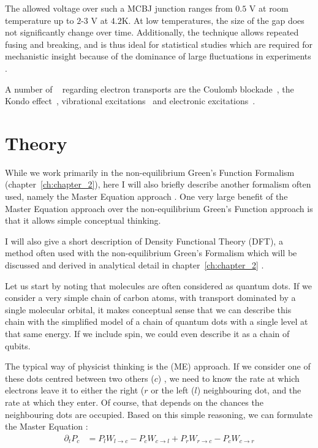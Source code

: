 The allowed voltage over such a MCBJ junction ranges from $0.5$ V at room temperature up to $2$-$3$ V at $4.2$K. At low temperatures, the size of the gap does not significantly change over time. Additionally, the technique allows repeated fusing and breaking, and is thus ideal for statistical studies which are required for mechanistic insight because of the dominance of large fluctuations in experiments \cite{ratnerrev2013}.

A number of ~\cite{koole} regarding electron transports are the Coulomb blockade~\cite{Park2000, Park2002}, the Kondo effect~\cite{Park2002}, vibrational excitations~\cite{vib1, vib2} and electronic excitations~\cite{elec1}.

\section{Theory}
While we work primarily in the non-equilibrium Green's Function Formalism (chapter~\ref{ch:chapter_2}), here I will also briefly describe another formalism often used, namely the Master Equation approach \cite{seldenthuis}. One very large benefit of the Master Equation approach over the non-equilibrium Green's Function approach is that it allows simple conceptual thinking.

I will also give a short description of Density Functional Theory (DFT), a method often used with the non-equilibrium Green's Formalism which will be discussed and derived in analytical detail in chapter~\ref{ch:chapter_2}  .

Let us start by noting that molecules are often considered as quantum dots. If we consider a very simple chain of carbon atoms, with transport dominated by a single molecular orbital, it makes conceptual sense that we can describe this chain with the simplified model of a chain of quantum dots with a single level at that same energy. If we include spin, we could even describe it as a chain of qubits.

The typical way of physicist thinking is the  (ME) approach. If we consider one of these dots centred between two others ($c$) , we need to know the rate at which electrons leave it to either the right ($r$ or the left ($l$) neighbouring dot, and the rate at which they enter. Of course, that depends on the chances the neighbouring dots are occupied. Based on this simple reasoning, we can formulate the Master Equation \cite{beenakker}:
\begin{align*}
\partial_t P_c &= P_l W_{l\rightarrow c} - P_c W_{c\rightarrow l} + P_r  W_{r\rightarrow c} - P_c W_{c\rightarrow r}
\end{align*}

